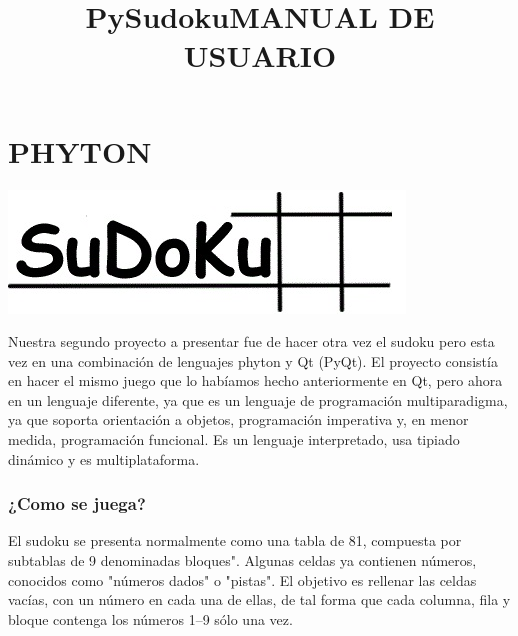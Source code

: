 \documentclass[12pt]{extbook}
\begin{document}
\chapter{PHYTON}
\begin{center}
\title{\Large{PySudoku}}\maketitle
\includegraphics[width=.70\textwidth]{suini.jpg}
\end{center}

Nuestra segundo proyecto a presentar fue de hacer otra vez el sudoku pero esta vez  en una combinación de lenguajes  phyton y Qt (PyQt).
El proyecto consistía en hacer el mismo juego que lo habíamos hecho anteriormente en Qt, pero ahora en un lenguaje diferente, ya que es un lenguaje de programación multiparadigma, ya que soporta orientación a objetos, programación imperativa y, en menor medida, programación funcional. Es un lenguaje interpretado, usa tipiado dinámico y es multiplataforma.
\newpage
\begin{center}
\title{MANUAL DE USUARIO}\maketitle
\end{center}
\subsection*{¿Como se juega?}
El sudoku se presenta normalmente como una tabla de 81, compuesta por subtablas de 9 denominadas bloques".
Algunas celdas ya contienen números, conocidos como "números dados" o "pistas".
 El objetivo es rellenar las celdas vacías, con un número en cada una de ellas, de tal forma que cada columna, fila y  bloque contenga los números 1–9 sólo una vez.\\
\end{document}
